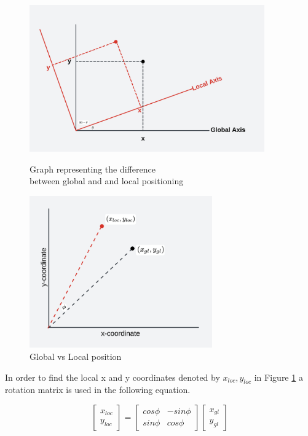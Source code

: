 \documentclass{report}
\begin{document}
\begin{figure}[H]
  \begin{minipage}{0.5\textwidth}
    \centering
    \includegraphics[width=0.9\textwidth]{Pictures/local_vs_global_1.png}
    \caption{Graph representing the difference\\ between global and and local positioning }
    \label{fig:local_vs_global_1}
  \end{minipage}
  \begin{minipage}{0.5\textwidth}
    \centering
    \includegraphics[width=0.7\textwidth]{Pictures/local_vs_global_2.png}
    \caption{Global vs Local position}
    \label{fig:local_vs_global_2}
  \end{minipage}
\end{figure}

In order to find the local x and y coordinates denoted by \(x_{loc}, y_{loc}\) in Figure \ref{fig:local_vs_global_2} a rotation matrix is used in the following equation. 

\begin{equation}
  \begin{bmatrix}
    x_{loc}\\
    y_{loc}
  \end{bmatrix}
  =
  \begin{bmatrix}
    cos\phi & -sin\phi\\
    sin\phi & cos\phi
  \end{bmatrix}
  \begin{bmatrix}
    x_{gl}\\
    y_{gl}
  \end{bmatrix}
\end{equation}
\end{document}
